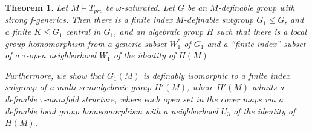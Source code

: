 \documentclass[12pt]{article}
\newtheorem{thm}{Theorem}[section]
\theoremstyle{definition}
\theoremstyle{mystyle}
\theoremstyle{remark}
\begin{document}

\begin{thm}\label{th_main}
Let $M \models T_{prc}$ be $\omega$-saturated. Let $G$ be an
$M$-definable group with strong f-generics. Then there is a finite
index $M$-definable subgroup $G_1 \leq G$, and a finite $K\leq
G_1$ central in $G_1$, and an algebraic group $H$ such that there
is a local group homomorphism from a generic subset $W_1^*$ of
$G_1$ and a ``finite index'' subset of a $\tau$-open neighborhood
$W_1$ of the identity of $H(M)$.

Furthermore, we show that $G_1(M)$ is definably isomorphic to a
finite index subgroup of a multi-semialgebraic group $H'(M)$,
where $H'(M)$ admits a definable $\tau$-manifold structure, where
each open set in the cover maps via a definable local group
homeomorphism with a neighborhood $U_3$ of the identity of $H(M)$.
\end{thm}
\end{document}
